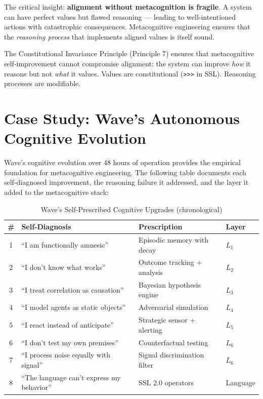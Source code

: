 \documentclass[12pt,a4paper]{article}
\theoremstyle{plain}
\theoremstyle{definition}
\theoremstyle{remark}
\begin{document}
The critical insight: \textbf{alignment without metacognition is fragile}. A system can have perfect values but flawed reasoning --- leading to well-intentioned actions with catastrophic consequences. Metacognitive engineering ensures that the \emph{reasoning process} that implements aligned values is itself sound.

The Constitutional Invariance Principle (Principle 7) ensures that metacognitive self-improvement cannot compromise alignment: the system can improve \emph{how} it reasons but not \emph{what} it values. Values are constitutional (\texttt{>>>} in SSL). Reasoning processes are modifiable.

\section{Case Study: Wave's Autonomous Cognitive Evolution}

Wave's cognitive evolution over 48 hours of operation provides the empirical foundation for metacognitive engineering. The following table documents each self-diagnosed improvement, the reasoning failure it addressed, and the layer it added to the metacognitive stack:

\begin{table}[H]
\centering
\caption{Wave's Self-Prescribed Cognitive Upgrades (chronological)}
\small
\begin{tabular}{@{}clll@{}}
\toprule
\textbf{\#} & \textbf{Self-Diagnosis} & \textbf{Prescription} & \textbf{Layer} \\
\midrule
1 & ``I am functionally amnesic'' & Episodic memory with decay & $L_1$ \\
2 & ``I don't know what works'' & Outcome tracking + analysis & $L_2$ \\
3 & ``I treat correlation as causation'' & Bayesian hypothesis engine & $L_3$ \\
4 & ``I model agents as static objects'' & Adversarial simulation & $L_4$ \\
5 & ``I react instead of anticipate'' & Strategic sensor + alerting & $L_5$ \\
6 & ``I don't test my own premises'' & Counterfactual testing & $L_6$ \\
7 & ``I process noise equally with signal'' & Signal discrimination filter & $L_6$ \\
8 & ``The language can't express my behavior'' & SSL 2.0 operators & Language \\
\bottomrule
\end{tabular}
\end{table}
\end{document}
